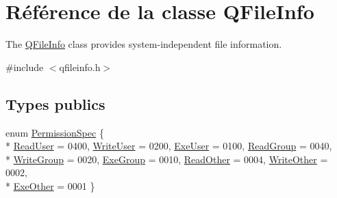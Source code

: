 \hypertarget{class_q_file_info}{}\section{Référence de la classe Q\+File\+Info}
\label{class_q_file_info}


The \hyperlink{class_q_file_info}{Q\+File\+Info} class provides system-\/independent file information.  




{\ttfamily \#include $<$qfileinfo.\+h$>$}

\subsection*{Types publics}
\begin{DoxyCompactItemize}
\item 
enum \hyperlink{class_q_file_info_a7fa0cd94ba7f096133efda899aeafab9}{Permission\+Spec} \{ \\*
\hyperlink{class_q_file_info_a7fa0cd94ba7f096133efda899aeafab9adcf47b5d887584386f8fe007cb242d40}{Read\+User} = 0400, 
\hyperlink{class_q_file_info_a7fa0cd94ba7f096133efda899aeafab9a9487edd08b766013a3c7510e3c251cb5}{Write\+User} = 0200, 
\hyperlink{class_q_file_info_a7fa0cd94ba7f096133efda899aeafab9a4b80903745c02b36295208c49b07adf2}{Exe\+User} = 0100, 
\hyperlink{class_q_file_info_a7fa0cd94ba7f096133efda899aeafab9ade06bbfb0db36e83c4cbc6e5f991ce5b}{Read\+Group} = 0040, 
\\*
\hyperlink{class_q_file_info_a7fa0cd94ba7f096133efda899aeafab9a9990af2fdefec643c0961b5f3537a91c}{Write\+Group} = 0020, 
\hyperlink{class_q_file_info_a7fa0cd94ba7f096133efda899aeafab9afa337c105efd68b6fb1758f8acb6bc09}{Exe\+Group} = 0010, 
\hyperlink{class_q_file_info_a7fa0cd94ba7f096133efda899aeafab9a51ce0caaed54ef7bced906770ae957f5}{Read\+Other} = 0004, 
\hyperlink{class_q_file_info_a7fa0cd94ba7f096133efda899aeafab9a37622a8bf9d69abc6491953c9e9837be}{Write\+Other} = 0002, 
\\*
\hyperlink{class_q_file_info_a7fa0cd94ba7f096133efda899aeafab9ad1df4a67168c2200766f62a876fc4366}{Exe\+Other} = 0001
 \}
\end{DoxyCompactItemize}
